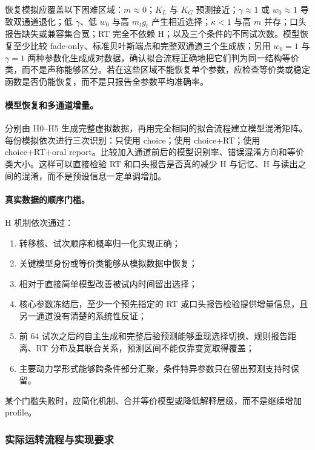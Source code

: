 恢复模拟应覆盖以下困难区域：$m\approx0$；$K_L$ 与 $K_G$ 预测接近；$\gamma\approx1$ 或 $w_0\approx1$ 导致双通道退化；低 $\gamma$、低 $w_0$ 与高 $m_tg_t$ 产生相近选择；$\kappa<1$ 与高 $m$ 并存；口头报告缺失或兼容集合宽；RT 完全不依赖 H；以及三个条件的不同试次数。模型恢复至少比较 fade-only、标准贝叶斯端点和完整双通道三个生成族；另用 $w_0=1$ 与 $\gamma=1$ 两种参数化生成成对数据，确认拟合流程正确地把它们判为同一结构等价类，而不是声称能够区分。若在这些区域不能恢复单个参数，应检查等价类或稳定函数是否仍能恢复，而不是只报告全参数平均准确率。

\paragraph{模型恢复和多通道增量。}
分别由 H0--H5 生成完整虚拟数据，再用完全相同的拟合流程建立模型混淆矩阵。每份模拟依次进行三次识别：只使用 choice；使用 choice+RT；使用 choice+RT+oral report。比较加入通道前后的模型识别率、错误混淆方向和等价类大小。这样可以直接检验 RT 和口头报告是否真的减少 H 与记忆、H 与读出之间的混淆，而不是预设信息一定单调增加。

\paragraph{真实数据的顺序门槛。}
H 机制依次通过：
\begin{enumerate}
    \item 转移核、试次顺序和概率归一化实现正确；
    \item 关键模型身份或等价类能够从模拟数据中恢复；
    \item 相对于直接简单模型改善被试内时间留出选择；
    \item 核心参数冻结后，至少一个预先指定的 RT 或口头报告检验提供增量信息，且另一通道没有清楚的系统性反证；
    \item 前 64 试次之后的自主生成和完整后验预测能够重现选择切换、规则报告距离、RT 分布及其联合关系，预测区间不能仅靠变宽取得覆盖；
    \item 主要动力学形式能够跨条件部分汇聚，条件特异参数只在留出预测支持时保留。
\end{enumerate}
某个门槛失败时，应简化机制、合并等价模型或降低解释层级，而不是继续增加 profile。


\subsubsection{实际运转流程与实现要求}

